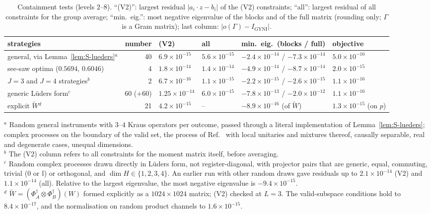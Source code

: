 \documentclass[aps,pra,onecolumn,notitlepage,superscriptaddress,longbibliography,nofootinbib,11pt]{revtex4-2}
\theoremstyle{remark}
\newcommand{\one}{\mathbb{I}}
\newcommand{\Igy}{I_{\mathrm{GYNI}}}
\begin{document}
\begin{table}[h]
\caption{Containment tests (levels $2$--$8$). ``(V2)'': largest residual $|a_i\cdot z-b_i|$ of the (V2) constraints; ``all'': largest residual of all constraints for the group average; ``min.\ eig.'': most negative eigenvalue of the blocks and of the full matrix (rounding only; $\Gamma$ is a Gram matrix); last column: $|o(\Gamma)-\Igy|$.}
\label{tab:S-contain}
\footnotesize
\begin{ruledtabular}
\begin{tabular}{lrllll}
strategies & number & (V2) & all & min.\ eig.\ (blocks / full) & objective\\
\hline
general, via Lemma~\ref{lem:S-lueders}$^{a}$ & 40 & $6.9\times10^{-15}$ & $5.6\times10^{-15}$ & $-2.4\times10^{-14}$ / $-7.3\times10^{-14}$ & $5.0\times10^{-16}$\\
see-saw optima ($0.5694$, $0.6046$) & 4 & $1.8\times10^{-14}$ & $1.4\times10^{-14}$ & $-4.9\times10^{-14}$ / $-8.7\times10^{-14}$ & $2.0\times10^{-15}$\\
$J=3$ and $J=4$ strategies$^{b}$ & 2 & $6.7\times10^{-16}$ & $1.1\times10^{-15}$ & $-2.2\times10^{-15}$ / $-2.6\times10^{-15}$ & $1.1\times10^{-16}$\\
generic L\"uders form$^{c}$ & 60 (+60) & $1.25\times10^{-14}$ & $6.0\times10^{-15}$ & $-7.8\times10^{-13}$ / $-2.0\times10^{-12}$ & $1.1\times10^{-16}$\\
explicit $\widetilde W$$^{d}$ & 21 & $4.2\times10^{-15}$ & -- & $-8.9\times10^{-16}$ (of $\widetilde W$) & $1.3\times10^{-15}$ (on $p$)\\
\end{tabular}
\end{ruledtabular}
\begin{flushleft}
\footnotesize
$^{a}$ Random general instruments with $3$--$4$ Kraus operators per outcome, passed through a literal implementation of Lemma~\ref{lem:S-lueders}; complex processes on the boundary of the valid set, the process of Ref.~\cite{Oreshkov2012} with local unitaries and mixtures thereof, causally separable, real and degenerate cases, unequal dimensions.\\
$^{b}$ The (V2) column refers to all constraints for the moment matrix itself, before averaging.\\
$^{c}$ Random complex processes drawn directly in L\"uders form, not register-diagonal, with projector pairs that are generic, equal, commuting, trivial ($0$ or $\one$) or orthogonal, and $\dim H\in\{1,2,3,4\}$. An earlier run with other random draws gave residuals up to $2.1\times10^{-14}$ (V2) and $1.1\times10^{-14}$ (all). Relative to the largest eigenvalue, the most negative eigenvalue is $-9.4\times10^{-15}$.\\
$^{d}$ $\widetilde W=(\Phi_A^\dagger\otimes\Phi_B^\dagger)(W)$ formed explicitly as a $1024\times1024$ matrix; (V2) checked at $L=3$. The valid-subspace conditions hold to $8.4\times10^{-17}$, and the normalisation on random product channels to $1.6\times10^{-15}$.
\end{flushleft}
\end{table}
\end{document}
